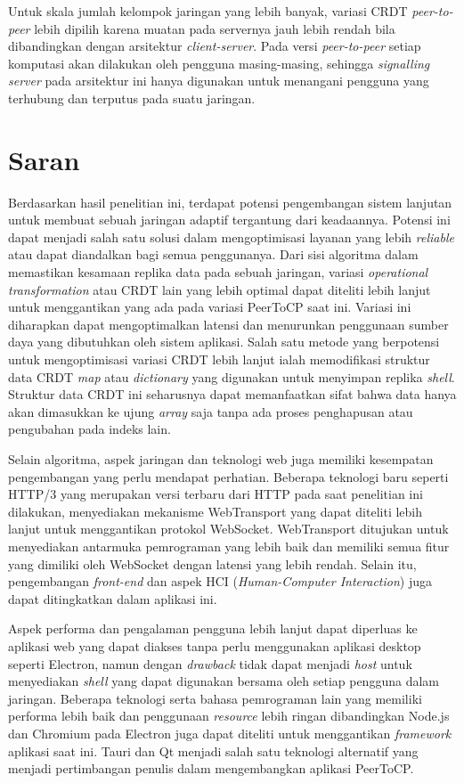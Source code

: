 Untuk skala jumlah kelompok jaringan yang lebih banyak, variasi CRDT \textit{peer-to-peer} lebih dipilih karena muatan pada servernya jauh lebih rendah bila dibandingkan dengan arsitektur \textit{client-server}. Pada versi \textit{peer-to-peer} setiap komputasi akan dilakukan oleh pengguna masing-masing, sehingga \textit{signalling server} pada arsitektur ini hanya digunakan untuk menangani pengguna yang terhubung dan terputus pada suatu jaringan.

\section{Saran}
\label{sec:saran}

Berdasarkan hasil penelitian ini, terdapat potensi pengembangan sistem lanjutan untuk membuat sebuah jaringan adaptif tergantung dari keadaannya. Potensi ini dapat menjadi salah satu solusi dalam mengoptimisasi layanan yang lebih \textit{reliable} atau dapat diandalkan bagi semua penggunanya. Dari sisi algoritma dalam memastikan kesamaan replika data pada sebuah jaringan, variasi \textit{operational transformation} atau CRDT lain yang lebih optimal dapat diteliti lebih lanjut untuk menggantikan yang ada pada variasi PeerToCP saat ini. Variasi ini diharapkan dapat mengoptimalkan latensi dan menurunkan penggunaan sumber daya yang dibutuhkan oleh sistem aplikasi. Salah satu metode yang berpotensi untuk mengoptimisasi variasi CRDT lebih lanjut ialah memodifikasi struktur data CRDT \textit{map} atau \textit{dictionary} yang digunakan untuk menyimpan replika \textit{shell}. Struktur data CRDT ini seharusnya dapat memanfaatkan sifat bahwa data hanya akan dimasukkan ke ujung \textit{array} saja tanpa ada proses penghapusan atau pengubahan pada indeks lain.

Selain algoritma, aspek jaringan dan teknologi web juga memiliki kesempatan pengembangan yang perlu mendapat perhatian. Beberapa teknologi baru seperti HTTP/3 yang merupakan versi terbaru dari HTTP pada saat penelitian ini dilakukan, menyediakan mekanisme WebTransport yang dapat diteliti lebih lanjut untuk menggantikan protokol WebSocket. WebTransport ditujukan untuk menyediakan antarmuka pemrograman yang lebih baik dan memiliki semua fitur yang dimiliki oleh WebSocket dengan latensi yang lebih rendah. Selain itu, pengembangan \textit{front-end} dan aspek HCI (\textit{Human-Computer Interaction}) juga dapat ditingkatkan dalam aplikasi ini.

Aspek performa dan pengalaman pengguna lebih lanjut dapat diperluas ke aplikasi web yang dapat diakses tanpa perlu menggunakan aplikasi desktop seperti Electron, namun dengan \textit{drawback} tidak dapat menjadi \textit{host} untuk menyediakan \textit{shell} yang dapat digunakan bersama oleh setiap pengguna dalam jaringan. Beberapa teknologi serta bahasa pemrograman lain yang memiliki performa lebih baik dan penggunaan \textit{resource} lebih ringan dibandingkan Node.js dan Chromium pada Electron juga dapat diteliti untuk menggantikan \textit{framework} aplikasi saat ini. Tauri dan Qt menjadi salah satu teknologi alternatif yang menjadi pertimbangan penulis dalam mengembangkan aplikasi PeerToCP.
